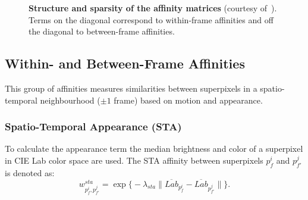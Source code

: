 \begin{figure}[t!]
 \centering
\quad
\quad
{}
\quad
 \caption[Structure and sparsity of the affinity matrices]{
  {\bf Structure and sparsity of the affinity matrices} (courtesy of~\cite{GalassoCS12}). Terms on the diagonal correspond to within-frame affinities and off the diagonal to between-frame affinities.}
\label{fig:seg_example}
\end{figure}
\subsection{Within- and Between-Frame Affinities}
This group of affinities measures similarities between superpixels in a spatio-temporal neighbourhood ($\pm1$ frame) based on motion and appearance. 
\subsubsection*{Spatio-Temporal Appearance (STA)}
To calculate the appearance term the median brightness and color of a superpixel in CIE Lab color space are used. The STA affinity between superpixels $p_f^i$ and $p_{f'}^j$
is denoted as:
\begin{equation*}
w^{sta}_{p_f^i,p_{f'}^j} = \exp {\bigl \{ -\lambda_{sta} \lVert \overline{Lab}_{p_f^i} - \overline{Lab}_{p_{f'}^j} \rVert \bigr\}}.
\end{equation*}
